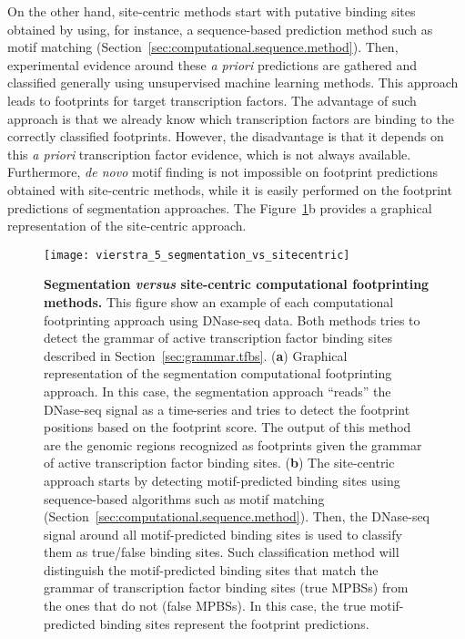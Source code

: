On the other hand, site-centric methods start with putative binding sites obtained by using, for instance, a sequence-based prediction method such as motif matching (Section~\ref{sec:computational.sequence.method}). Then, experimental evidence around these \emph{a priori} predictions are gathered and classified generally using unsupervised machine learning methods. This approach leads to footprints for target transcription factors. The advantage of such approach is that we already know which transcription factors are binding to the correctly classified footprints. However, the disadvantage is that it depends on this \emph{a priori} transcription factor evidence, which is not always available. Furthermore, \emph{de novo} motif finding is not impossible on footprint predictions obtained with site-centric methods, while it is easily performed on the footprint predictions of segmentation approaches. The Figure~\ref{fig:vierstra_5_segmentation_vs_sitecentric}b provides a graphical representation of the site-centric approach. 

\begin{figure}[h!]
\centering
\texttt{[image: vierstra\_5\_segmentation\_vs\_sitecentric]}
\caption[Segmentation \emph{versus} site-centric computational footprinting methods]{\textbf{Segmentation \emph{versus} site-centric computational footprinting methods.} This figure show an example of each computational footprinting approach using DNase-seq data. Both methods tries to detect the grammar of active transcription factor binding sites described in Section~\ref{sec:grammar.tfbs}. (\textbf{a}) Graphical representation of the segmentation computational footprinting approach. In this case, the segmentation approach ``reads'' the DNase-seq signal as a time-series and tries to detect the footprint positions based on the footprint score. The output of this method are the genomic regions recognized as footprints given the grammar of active transcription factor binding sites. (\textbf{b}) The site-centric approach starts by detecting motif-predicted binding sites using sequence-based algorithms such as motif matching (Section~\ref{sec:computational.sequence.method}). Then, the DNase-seq signal around all motif-predicted binding sites is used to classify them as true/false binding sites. Such classification method will distinguish the motif-predicted binding sites that match the grammar of transcription factor binding sites (true MPBSs) from the ones that do not (false MPBSs). In this case, the true motif-predicted binding sites represent the footprint predictions.}
\label{fig:vierstra_5_segmentation_vs_sitecentric}
\end{figure}


